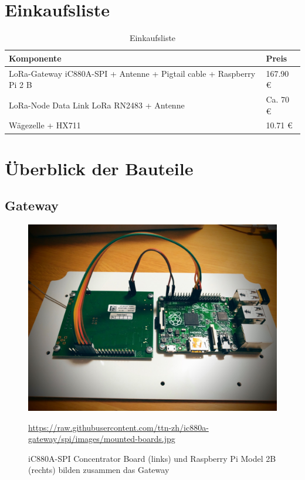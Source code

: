 \chapter{Einkaufsliste}

\begin{table}[h]
    \caption{Einkaufsliste}
    \centering

    \begin{tabular}{ | l |  l | }
    \hline
    Komponente & Preis \\ \hline
    LoRa-Gateway iC880A-SPI + Antenne + Pigtail cable + Raspberry Pi 2 B & 167.90 \euro \\ \hline
    LoRa-Node Data Link LoRa RN2483 + Antenne & Ca. 70 \euro \\ \hline
    Wägezelle + HX711 & 10.71 \euro \\ \hline
    \end{tabular}
\end{table}


\chapter{Überblick der Bauteile}
\section{Gateway}
\begin{figure}[ht]
    \center
    \includegraphics[width=15cm]{Bilder/mounted-boards.jpg}\\
    \caption{iC880A-SPI Concentrator Board (links) und Raspberry Pi Model 2B (rechts) bilden zusammen das Gateway}
    \begin{flushleft}
        \quelle\url{https://raw.githubusercontent.com/ttn-zh/ic880a-gateway/spi/images/mounted-boards.jpg}
    \end{flushleft}
    \label{fig:UeberblickDerBauteile}
\end{figure}
\newpage
